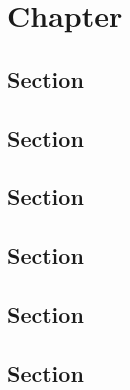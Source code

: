 \chapter{Chapter}
\section{Section}
\section{Section}
\section{Section}
\section{Section}
\section{Section}
\section{Section}
